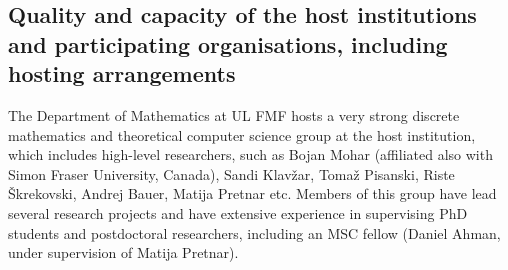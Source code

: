 \subsection{Quality and capacity of the host institutions and participating organisations, including hosting arrangements}
\label{sec:implementationmangement}




The Department of Mathematics at UL FMF hosts a very strong discrete mathematics and theoretical computer science group at the host institution, which includes high-level researchers, such as 
 Bojan Mohar (affiliated also with Simon Fraser University, Canada), Sandi Klavžar, Tomaž Pisanski, Riste Škrekovski, Andrej Bauer, Matija Pretnar etc.
Members of this group have lead several research projects and have extensive experience in supervising PhD students and postdoctoral researchers,
including an MSC fellow (Daniel Ahman, under supervision of Matija Pretnar).




%
%

